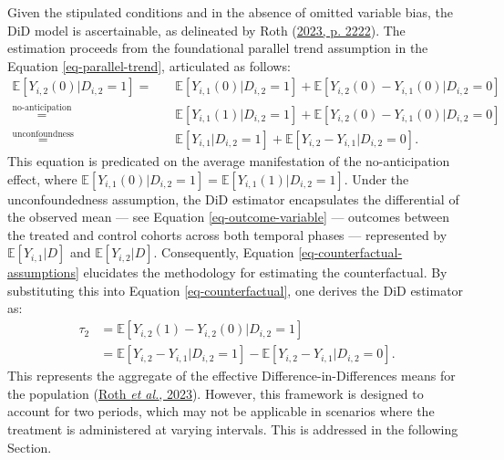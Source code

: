 \documentclass[12pt, a4paper, twoside]{article}
\numberwithin{equation}{subsection} %
\begin{document}
Given the stipulated conditions and in the absence of omitted variable
bias, the DiD model is ascertainable, as delineated by Roth
(\protect\hyperlink{ref-roth_whats_2023}{2023, p. 2222}). The estimation
proceeds from the foundational parallel trend assumption in the Equation
\eqref{eq-parallel-trend}, articulated as follows: \begin{equation}
\label{eq-counterfactual-assumptions}
\begin{split}
    \mathbb{E}[Y_{i,2}(0) | D_{i,2} = 1]  = & \quad \mathbb{E}[Y_{i,1}(0) | D_{i,2} = 1] + \mathbb{E}[Y_{i,2}(0) - Y_{i,1}(0) | D_{i,2} = 0] \\
    \stackrel{\text{no-anticipation}}{=} & \quad \mathbb{E}[Y_{i,1}(1) | D_{i,2} = 1] + \mathbb{E}[Y_{i,2}(0) - Y_{i,1}(0) | D_{i,2} = 0] \\
    \stackrel{\text{unconfoundness}}{=} & \quad \mathbb{E}[Y_{i,1} | D_{i,2} = 1] + \mathbb{E}[Y_{i,2} - Y_{i,1} | D_{i,2} = 0].
\end{split}
\end{equation} This equation is predicated on the average manifestation
of the no-anticipation effect, where
\(\mathbb{E}[Y_{i,1}(0) | D_{i,2} = 1] = \mathbb{E}[Y_{i,1}(1) | D_{i,2} = 1]\).
Under the unconfoundedness assumption, the DiD estimator encapsulates
the differential of the observed mean --- see Equation
\eqref{eq-outcome-variable} --- outcomes between the treated and control
cohorts across both temporal phases --- represented by
\(\mathbb{E}[Y_{i,1}|D]\) and \(\mathbb{E}[Y_{i,2}|D]\). Consequently,
Equation \eqref{eq-counterfactual-assumptions} elucidates the
methodology for estimating the counterfactual. By substituting this into
Equation \eqref{eq-counterfactual}, one derives the DiD estimator as:
\begin{equation} \label{eq-did-estimator}
\begin{split}
    \tau_2 & = \mathbb{E}[Y_{i,2}(1) - Y_{i,2}(0) | D_{i,2} = 1] \\
     & = \mathbb{E}[Y_{i,2} - Y_{i,1}| D_{i,2} = 1] - \mathbb{E}[Y_{i,2} - Y_{i,1} | D_{i,2} = 0].
\end{split}
\end{equation} This represents the aggregate of the effective
Difference-in-Differences means for the population
(\protect\hyperlink{ref-roth_whats_2023}{Roth \emph{et al.}, 2023}).
However, this framework is designed to account for two periods, which
may not be applicable in scenarios where the treatment is administered
at varying intervals. This is addressed in the following Section.
\end{document}
